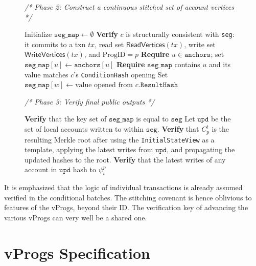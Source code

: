 \documentclass[onecolumn, 9pt, a4paper]{extarticle}
\begin{document}
\begin{figure}[!t]
\begin{whitebgbox}
\begin{algorithm}[H]
\begin{algorithmic}[1]
    \vspace{0.5em}
    \Statex \textit{/* Phase 2: Construct a continuous stitched set of account vertices */}
    
    \State Initialize $\texttt{seg\_map} \gets \emptyset$
        \State \textbf{Verify} $c$ is structurally consistent with \texttt{seg}: it commits to a txn $tx$, read set $\mathsf{ReadVertices}(tx)$, write set $\mathsf{WriteVertices}(tx)$, and $\mathrm{ProgID}=p$
                \State \textbf{Require} $u \in \texttt{anchors}$; set $\texttt{seg\_map}[u] \gets \texttt{anchors}[u]$
            \Else
                \State \textbf{Require} $\texttt{seg\_map}$ contains $u$ and its value matches $c$'s \texttt{ConditionHash} opening
            \EndIf
        \EndFor
            \State Set $\texttt{seg\_map}[w] \gets \text{value opened from } c.\texttt{ResultHash}$
        \EndFor
    \EndFor
    
    \vspace{0.5em}
    \Statex \textit{/* Phase 3: Verify final public outputs */}
    
    \State \textbf{Verify} that the key set of $\texttt{seg\_map}$  is equal to  $\texttt{seg}$
    \State Let $\texttt{upd}$ be the set of local accounts written to within $\texttt{seg}$.
    \State \textbf{Verify} that $C_p^t$ is the resulting Merkle root after using the \texttt{InitialStateView} as a template, applying the latest writes from $\texttt{upd}$, and propagating the updated hashes to the root.
    \State \textbf{Verify} that the latest writes of any account in $\texttt{upd}$ hash to $\psi^p_t$
\EndProcedure
\end{algorithmic}
\end{algorithm}
\end{whitebgbox}
\end{figure}

It is emphasized that the logic of individual transactions is already assumed verified in the conditional batches. The stitching covenant is hence oblivious to features of the vProgs, beyond their ID. The verification key of advancing the various vProgs can very well be a shared one.

\section{vProgs Specification}\label{sec:vProg_prover}
\end{document}
